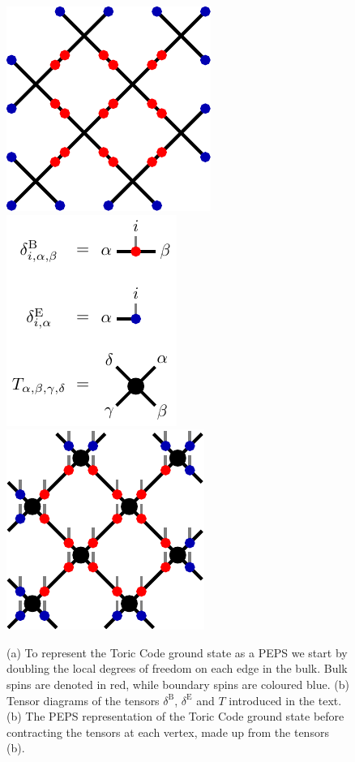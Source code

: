 \begin{figure}
	\centering
	\subcaptionbox{\label{fig:toric_code_doubling_dof}}
	{%
		\includegraphics[scale=1]{figures/tikz/toric_code/peps_representation/peps_representation_a.pdf}
	}
	\quad
	\subcaptionbox{\label{fig:toric_code_PEPS_representation_tensor_definitions}}
	{%
		\includegraphics[scale=1]{figures/tikz/toric_code/peps_representation/peps_representation_b.pdf}
	}
	\quad
	\subcaptionbox{\label{fig:toric_code_PEPS_representation}}
	{%
		\includegraphics[scale=1]{figures/tikz/toric_code/peps_representation/peps_representation_c.pdf}
	}
	\caption{(a) To represent the Toric Code ground state as a PEPS we start by doubling the local degrees of freedom on each edge in the bulk. Bulk spins are denoted in red, while boundary spins are coloured blue. (b) Tensor diagrams of the tensors $\delta^\text{B}$, $\delta^\text{E}$ and $T$ introduced in the text. (b) The PEPS representation of the Toric Code ground state before contracting the tensors at each vertex, made up from the tensors (b).}
	\label{fig:toric_code_doubling_dof_and_PEPS_representation}
\end{figure}
